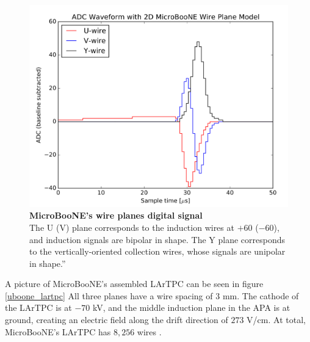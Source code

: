 \begin{figure}[h!]
	\begin{center}
		\includegraphics[scale=0.25]{Figures/uboone_dig_signal.png}
		\caption[MicroBooNE's wire planes digital signal]{{\textbf{MicroBooNE's wire planes digital signal}}  \\ The U (V) plane corresponds to the induction wires at $+60$ ($-60$), and induction signals are bipolar in shape. The Y plane corresponds to the vertically-oriented collection wires, whose signals are unipolar in shape.”
        \cite{microboone_electronics}}
		\label{uboone_digital_signal}	
	\end{center}
\end{figure}

A picture of MicroBooNE's assembled LArTPC can be seen in figure \ref{uboone_lartpc} All three planes have a wire spacing of $3$ mm. The cathode of the LArTPC is at $-70$ kV, and the middle induction plane in the APA is at ground, creating an electric field along the drift direction of $273$ V/cm. At total, MicroBooNE's LArTPC has $8,256$ wires \cite{microboone_design}. 

